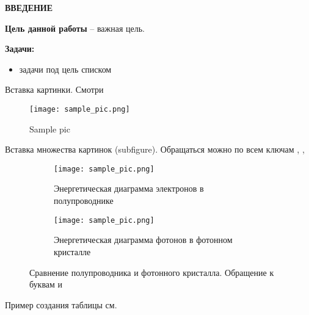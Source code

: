 \documentclass[../template.tex]{subfiles}
\begin{document}
	\begin{center}
		\normalsize\bfseries\MakeUppercase{ВВЕДЕНИЕ}
	\end{center}

	
\textbf{Цель данной работы} -- важная цель.

\textbf{Задачи:}
\begin{itemize}
	\item задачи под цель списком
\end{itemize}
	
\cite{kuchyanovLazernayaGeneraciyaOpalopodobnyh2016} %

Вставка картинки. Смотри 

\begin{figure}[h]
	\centering
	\texttt{[image: sample\_pic.png]}
	\caption{Sample pic}
	\label{fig:sample_pic}
\end{figure}

Вставка множества картинок (subfigure). Обращаться можно по всем ключам , , 

\begin{figure}[h]
	\centering
	\begin{subfigure}[t]{.48\textwidth}
		\centering
		\texttt{[image: sample\_pic.png]}  
		\caption{Энергетическая диаграмма электронов в полупроводнике}
		\label{fig:subfig_a}
	\end{subfigure}
	\hfill
	\begin{subfigure}[t]{.48\textwidth}
		\centering
		\texttt{[image: sample\_pic.png]} 
		\caption{Энергетическая диаграмма фотонов в фотонном кристалле}
		\label{fig:subfig_b}
	\end{subfigure}
	\caption{Сравнение полупроводника и фотонного кристалла. Обращение к буквам  и }
	\label{fig:fig_of_subfig}
\end{figure}	
	
	Пример создания таблицы см. 
	
\end{document}
